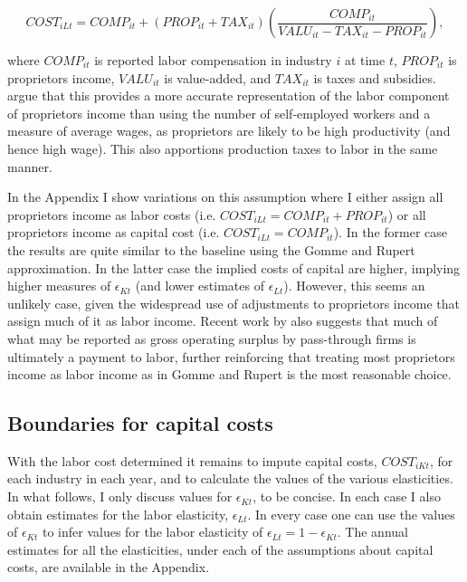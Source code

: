 \documentclass[11pt]{article}
\begin{document}
\begin{equation}
	COST_{iLt} = COMP_{it} + (PROP_{it} + TAX_{it})\left(\frac{COMP_{it}}{VALU_{it}-TAX_{it}-PROP_{it}}\right), \label{EQ_prop}
\end{equation}

where $COMP_{it}$ is reported labor compensation in industry $i$ at time $t$, $PROP_{it}$ is proprietors income, $VALU_{it}$ is value-added, and $TAX_{it}$ is taxes and subsidies. \cite{gommerupert2004} argue that this provides a more accurate representation of the labor component of proprietors income than using the number of self-employed workers and a measure of average wages, as proprietors are likely to be high productivity (and hence high wage). This also apportions production taxes to labor in the same manner.

In the Appendix I show variations on this assumption where I either assign all proprietors income as labor costs (i.e. $COST_{iLt} = COMP_{it} + PROP_{it}$) or all proprietors income as capital cost (i.e. $COST_{iLt} = COMP_{it}$). In the former case the results are quite similar to the baseline using the Gomme and Rupert approximation. In the latter case the implied costs of capital are higher, implying higher measures of $\epsilon_{Kt}$ (and lower estimates of $\epsilon_{Lt}$). However, this seems an unlikely case, given the widespread use of adjustments to proprietors income that assign much of it as labor income. Recent work by \cite{syzz2019} also suggests that much of what may be reported as gross operating surplus by pass-through firms is ultimately a payment to labor, further reinforcing that treating most proprietors income as labor income as in Gomme and Rupert is the most reasonable choice.

\subsection{Boundaries for capital costs}
With the labor cost determined it remains to impute capital costs, $COST_{iKt}$, for each industry in each year, and to calculate the values of the various elasticities. In what follows, I only discuss values for $\epsilon_{Kt}$, to be concise. In each case I also obtain estimates for the labor elasticity, $\epsilon_{Lt}$. In every case one can use the values of $\epsilon_{Kt}$ to infer values for the labor elasticity of $\epsilon_{Lt} = 1 - \epsilon_{Kt}$. The annual estimates for all the elasticities, under each of the assumptions about capital costs, are available in the Appendix.
\end{document}

